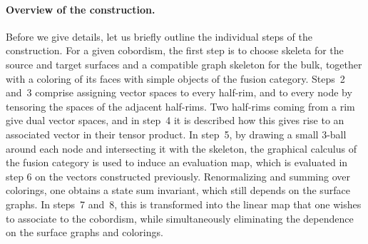\documentclass[10pt,a4paper]{amsart}
\numberwithin{equation}{section}
\theoremstyle{definition}
\begin{document}
\paragraph{Overview of the construction.} Before we give details, let us briefly outline the individual steps of the construction. For a given cobordism, the first step is to choose skeleta for the source and target surfaces and a compatible graph skeleton for the bulk, together with a coloring of its faces with simple objects of the fusion category. Steps~2 and~3 comprise assigning vector spaces to every half-rim, and to every node by tensoring the spaces of the adjacent half-rims. Two half-rims coming from a rim give dual vector spaces, and in step~4 it is described how this gives rise to an associated vector in their tensor product. In step~5, by drawing a small 3-ball around each node and intersecting it with the skeleton, the graphical calculus of the fusion category is used to induce an evaluation map, which is evaluated in step 6 on the vectors constructed previously. Renormalizing and summing over colorings, one obtains a state sum invariant, which still depends on the surface graphs. In steps~7 and~8, this is transformed into the linear map that one wishes to associate to the cobordism, while simultaneously eliminating the dependence on the surface graphs and colorings.
\end{document}
